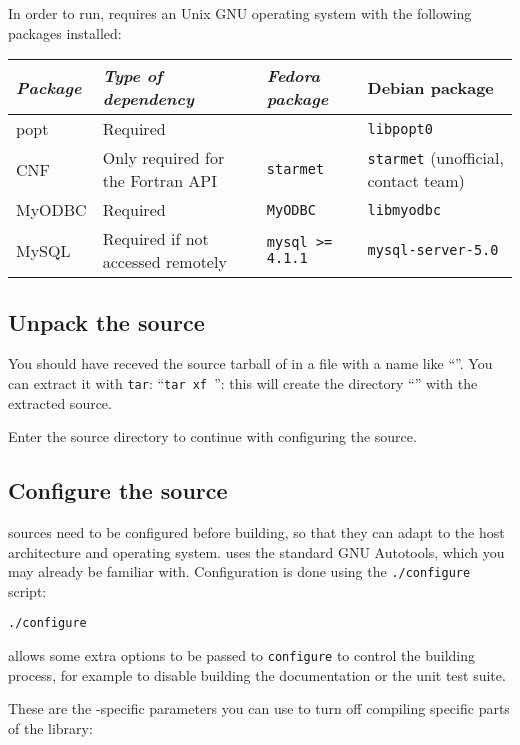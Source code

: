 In order to run, \dballe{} requires an Unix GNU operating system with the
following packages installed:

\begin{tabular}{|l|l|l|l|}
\hline
{\em Package} & {\em Type of dependency} & {\em Fedora package} & {\rm Debian package} \\
\hline
popt       & Required                        & {\tt } & {\tt libpopt0} \\
CNF        & Only required for the Fortran API & {\tt starmet} & {\tt starmet} (unofficial, contact \dballe{} team) \\
MyODBC     & Required                        & {\tt MyODBC} & {\tt libmyodbc} \\
MySQL      & Required if not accessed remotely & {\tt mysql >= 4.1.1 } & {\tt mysql-server-5.0} \\
\end{tabular}

\subsection{Unpack the source}

You should have receved the source tarball of \dballe{} in a file with a name
like ``\tarball{}''.  You can extract it with {\tt tar}: ``{\tt tar xf
\tarball{}}'': this will create the directory ``\sourcedir{}'' with the
extracted source.

Enter the source directory to continue with configuring the source.


\subsection{Configure the source}

\dballe{} sources need to be configured before building, so that they can adapt
to the host architecture and operating system.  \dballe{} uses the standard GNU
Autotools, which you may already be familiar with.  Configuration is done using
the {\tt ./configure} script:

\begin{verbatim}
./configure
\end{verbatim}

\dballe{} allows some extra options to be passed to {\tt configure} to control
the building process, for example to disable building the documentation or the
unit test suite.

These are the \dballe{}-specific parameters you can use to turn off compiling
specific parts of the library:

